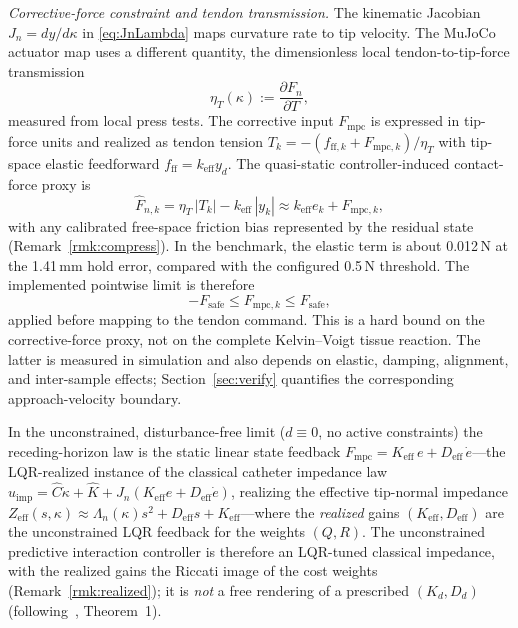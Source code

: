\emph{Corrective-force constraint and tendon transmission.} The kinematic Jacobian $J_n=dy/d\kappa$ in \eqref{eq:JnLambda} maps curvature rate to tip velocity. The MuJoCo actuator map uses a different quantity, the dimensionless local tendon-to-tip-force transmission
\begin{equation}
\eta_T(\kappa):=\frac{\partial F_n}{\partial T},
\label{eq:tendon_transmission}
\end{equation}
measured from local press tests. The corrective input $F_{\text{mpc}}$ is expressed in tip-force units and realized as tendon tension $T_k=-(f_{\text{ff},k}+F_{\text{mpc},k})/\eta_T$ with tip-space elastic feedforward $f_{\text{ff}}=k_{\text{eff}}y_d$. The quasi-static controller-induced contact-force proxy is
\begin{equation}
\hat F_{n,k}=\eta_T\,|T_k|-k_{\text{eff}}\,|y_k|\approx k_{\text{eff}}e_k+F_{\text{mpc},k},
\label{eq:force_map}
\end{equation}
with any calibrated free-space friction bias represented by the residual state (Remark~\ref{rmk:compress}). In the benchmark, the elastic term is about 0.012\,N at the 1.41\,mm hold error, compared with the configured 0.5\,N threshold. The implemented pointwise limit is therefore
\begin{equation}
-F_{\text{safe}}\le F_{\text{mpc},k}\le F_{\text{safe}},
\label{eq:force_constraint}
\end{equation}
applied before mapping to the tendon command. This is a hard bound on the corrective-force proxy, not on the complete Kelvin--Voigt tissue reaction. The latter is measured in simulation and also depends on elastic, damping, alignment, and inter-sample effects; Section~\ref{sec:verify} quantifies the corresponding approach-velocity boundary.

\begin{theorem}\label{thm:equiv}
In the unconstrained, disturbance-free limit ($d\equiv0$, no active constraints) the receding-horizon law is the static linear state feedback $F_{\text{mpc}}=K_{\text{eff}}\,e+D_{\text{eff}}\,\dot e$---the LQR-realized instance of the classical catheter impedance law $u_{\text{imp}}=\hat C\dot\kappa+\hat K+J_n(K_{\text{eff}}e+D_{\text{eff}}\dot e)$, realizing the effective tip-normal impedance $Z_{\text{eff}}(s,\kappa)\approx\Lambda_n(\kappa)s^2+D_{\text{eff}}s+K_{\text{eff}}$---where the \emph{realized} gains $(K_{\text{eff}},D_{\text{eff}})$ are the unconstrained LQR feedback for the weights $(Q,R)$. The unconstrained predictive interaction controller is therefore an LQR-tuned classical impedance, with the realized gains the Riccati image of the cost weights (Remark~\ref{rmk:realized}); it is \emph{not} a free rendering of a prescribed $(K_d,D_d)$ (following~\cite{cao2026phri}, Theorem~1).
\end{theorem}

